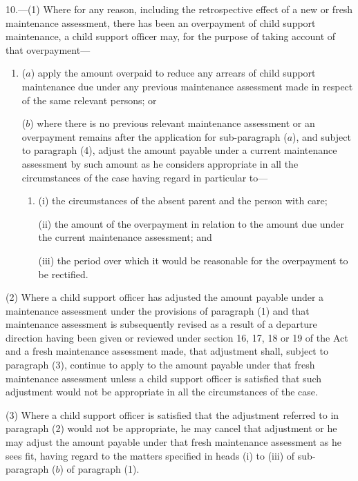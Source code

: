 \documentclass[a4paper]{article}
\begin{document}
10.—(1) Where for any reason, including the retrospective effect of a new or fresh maintenance assessment, there has been an overpayment of child support maintenance, a child support officer may, for the purpose of taking account of that overpayment—
\begin{enumerate}\item[]
($a$) apply the amount overpaid to reduce any arrears of child support maintenance due under any previous maintenance assessment made in respect of the same relevant persons; or

($b$) where there is no previous relevant maintenance assessment or an overpayment remains after the application for sub-paragraph ($a$), and subject to paragraph (4), adjust the amount payable under a current maintenance assessment by such amount as he considers appropriate in all the circumstances of the case having regard in particular to—
\begin{enumerate}\item[]
(i) the circumstances of the absent parent and the person with care;

\begin{sloppypar}
(ii) the amount of the overpayment in relation to the amount due under the current maintenance assessment; and
\end{sloppypar}

(iii) the period over which it would be reasonable for the overpayment to be rectified.
\end{enumerate}
\end{enumerate}

(2) Where a child support officer has adjusted the amount payable under a maintenance assessment under the provisions of paragraph (1) and that maintenance assessment is subsequently 
revised as a result of a departure direction having been given or  %
reviewed under section 16, 17, 18 or 19 of the Act and a fresh maintenance assessment made, that adjustment shall, subject to paragraph (3), continue to apply to the amount payable under that fresh maintenance assessment unless a child support officer is satisfied that such adjustment would not be appropriate in all the circumstances of the case.

(3) Where a child support officer is satisfied that the adjustment referred to in paragraph (2) would not be appropriate, he may cancel that adjustment or he may adjust the amount payable under that fresh maintenance assessment as he sees fit, having regard to the matters specified in heads (i) to (iii) of sub-paragraph ($b$) of paragraph (1).
\end{document}
